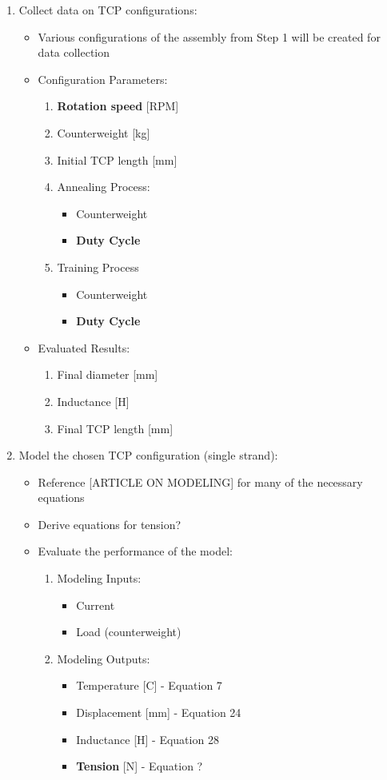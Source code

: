 \begin{enumerate}
		\item Collect data on TCP configurations:
		\begin{itemize}
			\item Various configurations of the assembly from Step 1 will be created for data collection
			\item Configuration Parameters:
			\begin{enumerate}
				\item \textbf{Rotation speed} [RPM]
				\item Counterweight [kg]
				\item Initial TCP length [mm]
				\item Annealing Process:
				\begin{itemize}
					\item Counterweight
					\item \textbf{Duty Cycle}
				\end{itemize}
				\item Training Process
				\begin{itemize}
					\item Counterweight
					\item \textbf{Duty Cycle}
				\end{itemize}
			\end{enumerate}
			\item Evaluated Results:
			\begin{enumerate}
				\item Final diameter [mm]
				\item Inductance [H]
				\item Final TCP length [mm]
			\end{enumerate}
		\end{itemize}
		
		\item Model the chosen TCP configuration (single strand):
		\begin{itemize}
			\item Reference [ARTICLE ON MODELING] for many of the necessary equations
			\item Derive equations for tension?
			\item Evaluate the performance of the model:
			\begin{enumerate}
				\item Modeling Inputs:
				\begin{itemize}
					\item Current
					\item Load (counterweight)
				\end{itemize}
				\item Modeling Outputs:
				\begin{itemize}
					\item Temperature [C] - Equation 7
					\item Displacement [mm] - Equation 24
					\item Inductance [H] - Equation 28
					\item \textbf{Tension} [N] - Equation ?
				\end{itemize}
			\end{enumerate}
		\end{itemize}
	\end{enumerate}
	

